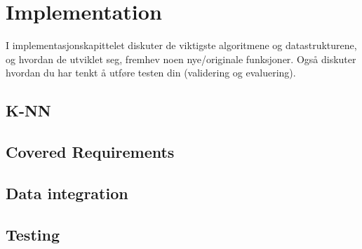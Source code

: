 
\chapter{Implementation}

\minitoc

I implementasjonskapittelet diskuter de viktigste algoritmene
og datastrukturene, og hvordan de utviklet seg, fremhev noen
nye/originale funksjoner. Også diskuter hvordan du har
tenkt å utføre testen din (validering og evaluering).

\clearpage

\section{K-NN}

\section{Covered Requirements}

\section{Data integration}

\section{Testing}
